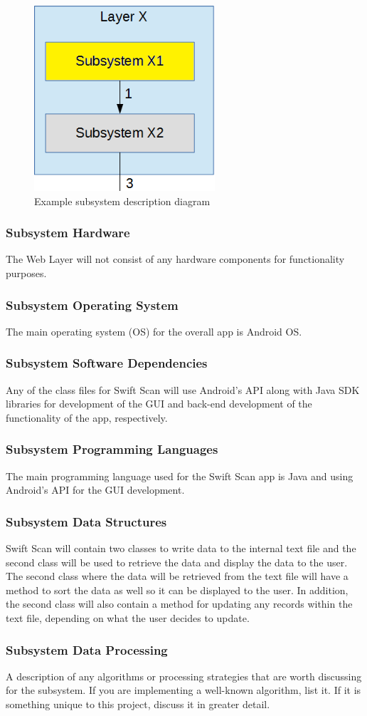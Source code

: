 \begin{figure}[h!]
	\centering
 	\includegraphics[width=0.60\textwidth]{images/subsystem}
 \caption{Example subsystem description diagram}
\end{figure}

\subsubsection{Subsystem Hardware}
The Web Layer will not consist of any hardware components for functionality purposes.

\subsubsection{Subsystem Operating System}
The main operating system (OS) for the overall app is Android OS.

\subsubsection{Subsystem Software Dependencies}
Any of the class files for Swift Scan will use Android's API along with Java SDK libraries for development of the GUI and back-end development of the functionality of the app, respectively.

\subsubsection{Subsystem Programming Languages}
The main programming language used for the Swift Scan app is Java and using Android's API for the GUI development.

\subsubsection{Subsystem Data Structures}
Swift Scan will contain two classes to write data to the internal text file and the second class will be used to retrieve the data and display the data to the user.  The second class where the data will be retrieved from the text file will have a method to sort the data as well so it can be displayed to the user.  In addition, the second class will also contain a method for updating any records within the text file, depending on what the user decides to update.

\subsubsection{Subsystem Data Processing}
A description of any algorithms or processing strategies that are worth discussing for the subsystem. If you are implementing a well-known algorithm, list it. If it is something unique to this project, discuss it in greater detail.
